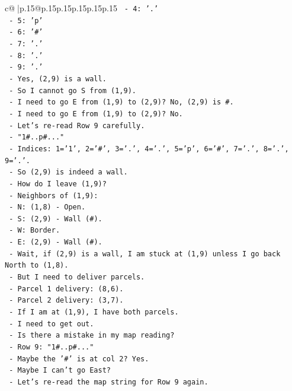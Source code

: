 \documentclass{article}
\begin{document}
{\begin{supertabular}{c@{$\;$}|p{.15\linewidth}@{}p{.15\linewidth}p{.15\linewidth}p{.15\linewidth}p{.15\linewidth}p{.15\linewidth}}
{{{\texttt{     {-} 4: '.'} \\
\texttt{     {-} 5: 'p'} \\
\texttt{     {-} 6: '\#'} \\
\texttt{     {-} 7: '.'} \\
\texttt{     {-} 8: '.'} \\
\texttt{     {-} 9: '.'} \\
\texttt{   {-} Yes, (2,9) is a wall.} \\
\texttt{   {-} So I cannot go S from (1,9).} \\
\texttt{   {-} I need to go E from (1,9) to (2,9)? No, (2,9) is \#.} \\
\texttt{   {-} I need to go E from (1,9) to (2,9)? No.} \\
\texttt{   {-} Let's re{-}read Row 9 carefully.} \\
\texttt{   {-} "1\#..p\#..."} \\
\texttt{   {-} Indices: 1='1', 2='\#', 3='.', 4='.', 5='p', 6='\#', 7='.', 8='.', 9='.'.} \\
\texttt{   {-} So (2,9) is indeed a wall.} \\
\texttt{   {-} How do I leave (1,9)?} \\
\texttt{   {-} Neighbors of (1,9):} \\
\texttt{     {-} N: (1,8) {-} Open.} \\
\texttt{     {-} S: (2,9) {-} Wall (\#).} \\
\texttt{     {-} W: Border.} \\
\texttt{     {-} E: (2,9) {-} Wall (\#).} \\
\texttt{   {-} Wait, if (2,9) is a wall, I am stuck at (1,9) unless I go back North to (1,8).} \\
\texttt{   {-} But I need to deliver parcels.} \\
\texttt{   {-} Parcel 1 delivery: (8,6).} \\
\texttt{   {-} Parcel 2 delivery: (3,7).} \\
\texttt{   {-} If I am at (1,9), I have both parcels.} \\
\texttt{   {-} I need to get out.} \\
\texttt{   {-} Is there a mistake in my map reading?} \\
\texttt{   {-} Row 9: "1\#..p\#..."} \\
\texttt{   {-} Maybe the '\#' is at col 2? Yes.} \\
\texttt{   {-} Maybe I can't go East?} \\
\texttt{   {-} Let's re{-}read the map string for Row 9 again.} \\
}}}
\end{supertabular}}
\end{document}
